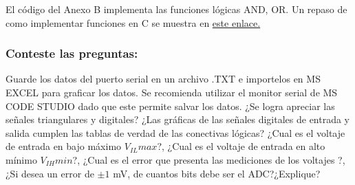 El código del Anexo B implementa las funciones lógicas AND, OR. Un repaso de como implementar funciones en C se muestra en \href{https://aprendiendoarduino.wordpress.com/2016/11/16/funciones-definidas-por-usuario-2/}{este enlace.} 

\subsubsection{Conteste las preguntas:}

Guarde los datos del puerto serial en un archivo .TXT e importelos en MS EXCEL para graficar los datos.
Se recomienda utilizar el monitor serial de MS CODE STUDIO dado que este permite salvar los datos.
¿Se logra apreciar las señales triangulares y digitales?
¿Las gráficas de las señales digitales de entrada y salida cumplen las tablas de verdad de las conectivas lógicas?
¿Cual es el voltaje de entrada en bajo máximo $V_{IL} max$?,
¿Cual es el voltaje de entrada en alto mínimo $V_{IH} min$?,
¿Cual es el error que presenta las mediciones de los voltajes ?,
¿Si desea un error de $\pm1$ mV, de cuantos bits debe ser el ADC?¿Explique?